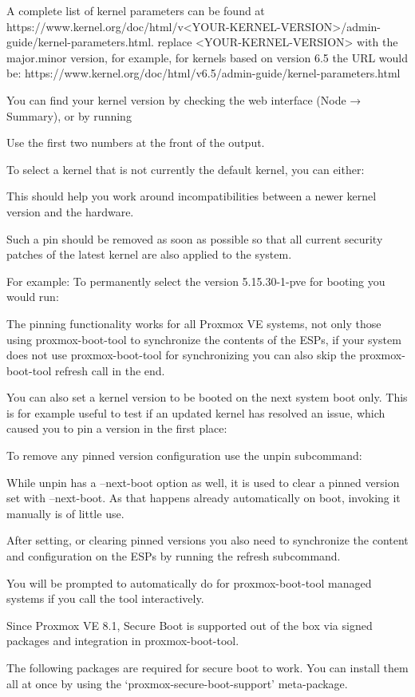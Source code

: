 A complete list of kernel parameters can be found at https://www.kernel.org/doc/html/v<YOUR-KERNEL-VERSION>/admin-guide/kernel-parameters.html. replace <YOUR-KERNEL-VERSION> with the major.minor version, for example, for kernels based on version 6.5 the URL would be: https://www.kernel.org/doc/html/v6.5/admin-guide/kernel-parameters.html

You can find your kernel version by checking the web interface (Node → Summary), or by running

Use the first two numbers at the front of the output.

To select a kernel that is not currently the default kernel, you can either:

This should help you work around incompatibilities between a newer kernel version and the hardware.

Such a pin should be removed as soon as possible so that all current security patches of the latest kernel are also applied to the system.

For example: To permanently select the version 5.15.30-1-pve for booting you would run:

The pinning functionality works for all Proxmox VE systems, not only those using proxmox-boot-tool to synchronize the contents of the ESPs, if your system does not use proxmox-boot-tool for synchronizing you can also skip the proxmox-boot-tool refresh call in the end.

You can also set a kernel version to be booted on the next system boot only. This is for example useful to test if an updated kernel has resolved an issue, which caused you to pin a version in the first place:

To remove any pinned version configuration use the unpin subcommand:

While unpin has a --next-boot option as well, it is used to clear a pinned version set with --next-boot. As that happens already automatically on boot, invoking it manually is of little use.

After setting, or clearing pinned versions you also need to synchronize the content and configuration on the ESPs by running the refresh subcommand.

You will be prompted to automatically do for proxmox-boot-tool managed systems if you call the tool interactively.

Since Proxmox VE 8.1, Secure Boot is supported out of the box via signed packages and integration in proxmox-boot-tool.

The following packages are required for secure boot to work. You can install them all at once by using the ‘proxmox-secure-boot-support’ meta-package.

